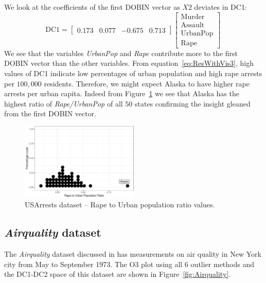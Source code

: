 \documentclass[letter,12pt]{article}
\begin{document}
We look at the coefficients of the first DOBIN vector as $X2$ deviates in DC1:
\begin{equation}\label{eq:ResWithVis3}
	\text{DC1} = \begin{bmatrix}
		0.173 & 0.077 & -0.675 & 0.713
	\end{bmatrix}
	\begin{bmatrix}
		\text{Murder}   \\
		\text{Assault}  \\
		\text{UrbanPop} \\
		\text{Rape}
	\end{bmatrix} \,
\end{equation}
We see that the variables \textit{UrbanPop} and \textit{Rape} contribute more to the first DOBIN vector than the other variables. From equation~\eqref{eq:ResWithVis3}, high values of DC1 indicate low percentages of urban population and high rape arrests per $100,000$ residents. Therefore, we might expect Alaska to have higher rape arrests per urban capita. Indeed from Figure~\ref{fig:USArrests3} we see that Alaska has the highest ratio of \textit{Rape/UrbanPop} of all $50$ states confirming the insight gleaned from the first DOBIN vector.

\begin{figure}[!ht]
	\centering
	\includegraphics[width=0.5\textwidth]{Ex3_3.pdf}
	\caption{USArrests dataset -- Rape to Urban population ratio values.}
	\label{fig:USArrests3}
\end{figure}

\subsection{\textit{Airquality} dataset}\label{sec:ResWithVis4}

The \textit{Airquality} dataset discussed in \cite{john1983graphical} has measurements on air quality in New York city from May to September 1973. The O3 plot using all $6$ outlier methods and the DC1-DC2 space of this dataset are shown in Figure~\ref{fig:Airquality}.
\end{document}
